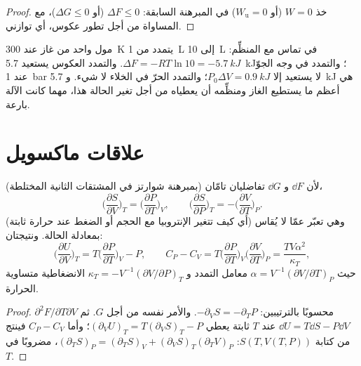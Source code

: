 \begin{proof}
خذ $W = 0$ (أو $W_{\text{u}} = 0$) في المبرهنة السابقة: $\Delta F
\le 0$ (أو $\Delta G \le 0$)، مع المساواة من أجل تطور عكوس، أي
توازني.
\end{proof}

\begin{example}\label{ex:b2:thermodynamic-potentials:expansion}
مول واحد من غاز عند \qty{300}{K} يتمدد من \qty{1}{L} إلى \qty{10}{L} في
تماس مع المنظِّم: $\Delta F = -RT\ln 10 = \qty{-5.7}{kJ}$. والتمدد
العكوس يستعيد \qty{5.7}{kJ}؛ والتمدد في وجه الجوّ
عند \qty{1}{bar} لا يستعيد إلا $P_0\Delta V = \qty{0.9}{kJ}$؛ والتمدد
الحرّ في الخلاء لا شيء. و \qty{5.7}{kJ} هي أعظم ما
يستطيع الغاز ومنظِّمه أن يعطياه من أجل تغير الحالة هذا، مهما
كانت الآلة بارعة.
\end{example}

\section{علاقات ماكسويل}

\begin{theorem}\label{thm:b2:thermodynamic-potentials:maxwell}
لأن $\dd F$ و $\dd G$ تفاضليان تامّان (بمبرهنة شوارتز
في المشتقات الثانية المختلطة)،
\[
\Big(\frac{\partial S}{\partial V}\Big)_T = \Big(\frac{\partial P}{\partial T}\Big)_V,
\qquad
\Big(\frac{\partial S}{\partial P}\Big)_T = -\Big(\frac{\partial V}{\partial T}\Big)_P .
\]
وهي تعبّر عمّا لا يُقاس (أي كيف تتغير الإنتروبيا مع الحجم أو
الضغط عند حرارة ثابتة) بمعادلة الحالة. ونتيجتان:
\[
\Big(\frac{\partial U}{\partial V}\Big)_T = T\Big(\frac{\partial P}{\partial T}\Big)_V - P,
\qquad
C_P - C_V = T\Big(\frac{\partial P}{\partial T}\Big)_V\Big(\frac{\partial V}{\partial T}\Big)_P
= \frac{TV\alpha^2}{\kappa_T} ,
\]
حيث $\alpha = V^{-1}(\partial V/\partial T)_P$ معامل التمدد و
$\kappa_T = -V^{-1}(\partial V/\partial P)_T$ الانضغاطية متساوية الحرارة.
\end{theorem}

\begin{proof}
$\partial^2F/\partial T\partial V$ محسوبًا بالترتيبين: $-\partial_VS =
-\partial_TP$. والأمر نفسه من أجل $G$. ثم $\dd U = T\dd S - P\dd V$ عند $T$ ثابتة
يعطي $(\partial_VU)_T = T(\partial_VS)_T - P$؛ وأما $C_P - C_V$ فينتج
من كتابة $S(T,V(T,P))$: $(\partial_TS)_P = (\partial_TS)_V +
(\partial_VS)_T(\partial_TV)_P$، مضروبًا في $T$.
\end{proof}

